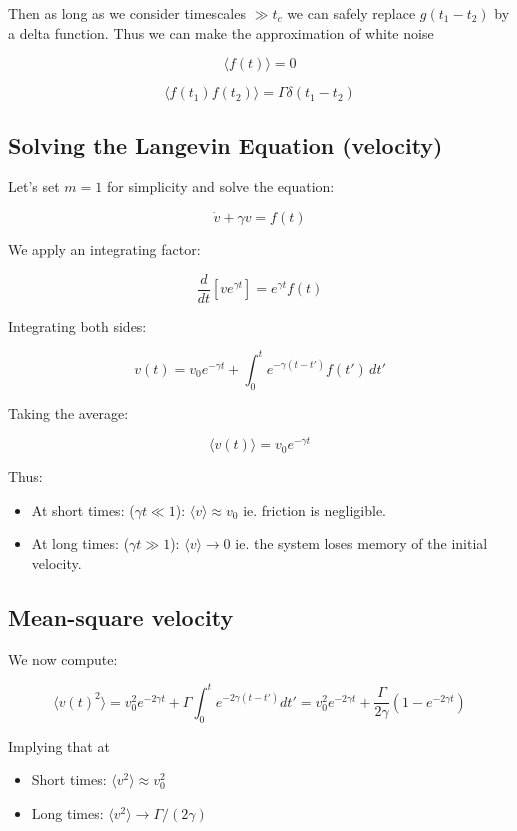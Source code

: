 \documentclass[
  letterpaper,
  enabledeprecatedfontcommands]{report}
\providecommand{\tightlist}{%
  \setlength{\itemsep}{0pt}\setlength{\parskip}{0pt}}
\begin{document}
Then as long as we consider timescales \(\gg t_c\) we can safely replace
\(g(t_1 - t_2)\) by a delta function. Thus we can make the approximation
of white noise

\[
\langle f(t) \rangle = 0
\]

\[
\langle f(t_1) f(t_2) \rangle = \Gamma \delta(t_1 - t_2)
\]

\subsection{Solving the Langevin Equation
(velocity)}\label{solving-the-langevin-equation-velocity}

Let's set \(m = 1\) for simplicity and solve the equation:

\[
\dot{v} + \gamma v = f(t)
\]

We apply an integrating factor:

\[
\frac{d}{dt} \left[ v e^{\gamma t} \right] = e^{\gamma t} f(t)
\]

Integrating both sides:

\[
v(t) = v_0 e^{-\gamma t} + \int_0^t e^{-\gamma (t - t')} f(t')\, dt'
\]

Taking the average:

\[
\langle v(t) \rangle = v_0 e^{-\gamma t}
\]

Thus:

\begin{itemize}
\tightlist
\item
  At short times: (\(\gamma t \ll 1\)):
  \(\langle v \rangle \approx v_0\) ie. friction is negligible.
\item
  At long times: (\(\gamma t \gg 1\)): \(\langle v \rangle \to 0\) ie.
  the system loses memory of the initial velocity.
\end{itemize}

\subsection{Mean-square velocity}\label{mean-square-velocity}

We now compute:

\[
\langle v(t)^2 \rangle = v_0^2 e^{-2\gamma t} + \Gamma \int_0^t e^{-2\gamma (t - t')} dt' = v_0^2 e^{-2\gamma t} + \frac{\Gamma}{2\gamma} \left(1 - e^{-2\gamma t} \right)
\]

Implying that at

\begin{itemize}
\tightlist
\item
  Short times: \(\langle v^2 \rangle \approx v_0^2\)
\item
  Long times: \(\langle v^2 \rangle \to \Gamma / (2\gamma)\)
\end{itemize}
\end{document}
